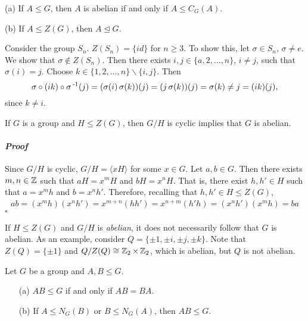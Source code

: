\documentclass[11pt]{book}
\theoremstyle{definition}   \newtheorem{defn}[counter]{Definition} %
\newcommand{\bs}{\backslash}   \newcommand{\A}{\mathcal{A}}   \newcommand{\sy}{\textnormal{Syl}}   \newcommand{\size}[1]{\left| #1 \right|}
\newcommand{\nsg}{\mathrel{\unlhd}}   \newcommand{\ind}{\parindent24pt}   \newcommand{\vn}{\varnothing}
\newenvironment{prf}{\paragraph{\textit{Proof}}}{\hfill$\square$}
\newcommand{\vs}{\vspace{8pt}}
\numberwithin{counter}{chapter}
\begin{document}
\begin{remark}
\item[(a)] If $A \leq G$, then $A$ is abelian if and only if $A \leq C_G(A)$.
\item[(b)] If $A \leq Z(G)$, then $A \nsg G$.
\end{remark}

\vs

\begin{example}
Consider the group $S_n$. $Z(S_n) = \{id\}$ for $n \geq 3$. To show this, let $\sigma \in S_n$, $\sigma \ne e$. We show that $\sigma \notin Z(S_n)$. Then there exists $i,j \in \{a,2,\dots,n\}$, $i \ne j$, such that $\sigma(i) = j$. Choose $k \in \{1,2,\dots,n\} \bs  \{i,j\}$. Then
	\[\sigma \circ (ik) \circ \sigma\operatorname{^{-1}} (j) = (\sigma(i)\, \sigma(k))(j) = (j\, \sigma(k))(j) = \sigma(k) \ne j = (ik)(j), \]
since $k \ne i$.
\end{example}

\vs

\begin{lemma}
If $G$ is a group and $H \leq Z(G)$, then $G/H$ is cyclic implies that $G$ is abelian.
\end{lemma}

\begin{prf}
Since $G/H$ is cyclic, $G/H = \langle xH \rangle$ for some $x \in G$. Let $a,b \in G$. Then there exists $m,n \in \operatorname{\mathbb{Z}}$ such that $aH = x^mH$ and $bH = x^nH$. That is, there exist $h,h' \in H$ such that $a = x^mh$ and $b = x^nh'$. Therefore, recalling that $h,h' \in H \leq Z(G)$,
	\begin{align*}
	ab = (x^mh)(x^nh') = x^{m+n}(hh') = x^{n+m}(h'h) = (x^nh')(x^mh) = ba
	\end{align*}
\end{prf}

\vs

\begin{remark*}
If $H \leq Z(G)$ and $G/H$ is \textit{abelian}, it does not necessarily follow that $G$ is abelian. As an example, consider $Q = \{\pm 1, \pm i, \pm j, \pm k\}$. Note that $Z(Q) = \{\pm 1\}$ and $Q / Z(Q) \cong \operatorname{\mathbb{Z}}_2 \times \operatorname{\mathbb{Z}}_2$, which is abelian, but $Q$ is not abelian.
\end{remark*}

\vs

\begin{lemma}
Let $G$ be a group and $A,B \leq G$.
	\begin{enumerate}
	\item[(a)] $AB \leq G$ if and only if $AB = BA$.
	\item[(b)] If $A \leq N_G(B)$ or $B \leq N_G(A)$, then $AB \leq G$.
	\end{enumerate}
\end{lemma}
\end{document}
